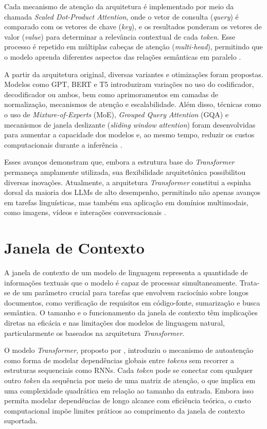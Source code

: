 Cada mecanismo de atenção da arquitetura é implementado por meio da chamada \textit{Scaled Dot-Product Attention}, onde o vetor de consulta (\textit{query}) é comparado com os vetores de chave (\textit{key}), e os resultados ponderam os vetores de valor (\textit{value}) para determinar a relevância contextual de cada \textit{token}. Esse processo é repetido em múltiplas cabeças de atenção (\textit{multi-head}), permitindo que o modelo aprenda diferentes aspectos das relações semânticas em paralelo \cite{ankit2024transformer, raschka2025bigllm}.

A partir da arquitetura original, diversas variantes e otimizações foram propostas. Modelos como GPT, BERT e T5 introduziram variações no uso do codificador, decodificador ou ambos, bem como aprimoramentos em camadas de normalização, mecanismos de atenção e escalabilidade. Além disso, técnicas como o uso de \textit{Mixture-of-Experts} (MoE), \textit{Grouped Query Attention} (GQA) e mecanismos de janela deslizante (\textit{sliding window attention}) foram desenvolvidas para aumentar a capacidade dos modelos e, ao mesmo tempo, reduzir os custos computacionais durante a inferência .

Esses avanços demonstram que, embora a estrutura base do \textit{Transformer} permaneça amplamente utilizada, sua flexibilidade arquitetônica possibilitou diversas inovações. Atualmente, a arquitetura \textit{Transformer} constitui a espinha dorsal da maioria dos LLMs de alto desempenho, permitindo não apenas avanços em tarefas linguísticas, mas também sua aplicação em domínios multimodais, como imagens, vídeos e interações conversacionais \cite{ankit2024transformer, raschka2025bigllm}.


\section{Janela de Contexto}

A janela de contexto de um modelo de linguagem representa a quantidade de informações textuais que o modelo é capaz de processar simultaneamente. Trata-se de um parâmetro crucial para tarefas que envolvem raciocínio sobre longos documentos, como verificação de requisitos em código-fonte, sumarização e busca semântica. O tamanho e o funcionamento da janela de contexto têm implicações diretas na eficácia e nas limitações dos modelos de linguagem natural, particularmente os baseados na arquitetura \textit{Transformer}.

O modelo \textit{Transformer}, proposto por , introduziu o mecanismo de autoatenção como forma de modelar dependências globais entre \textit{tokens} sem recorrer a estruturas sequenciais como RNNs. Cada \textit{token} pode se conectar com qualquer outro \textit{token} da sequência por meio de uma matriz de atenção, o que implica em uma complexidade quadrática em relação ao tamanho da entrada. Embora isso permita modelar dependências de longo alcance com eficiência teórica, o custo computacional impõe limites práticos ao comprimento da janela de contexto suportada.

